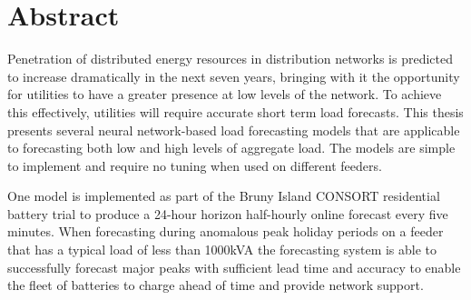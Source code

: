 
\chapter{Abstract}

Penetration of distributed energy resources in distribution networks is predicted to increase dramatically in the next seven years, bringing with it the opportunity for utilities to have a greater presence at low levels of the network.
To achieve this effectively, utilities will require accurate short term load forecasts.
This thesis presents several neural network-based load forecasting models that are applicable to forecasting both low and high levels of aggregate load.
The models are simple to implement and require no tuning when used on different feeders.

One model is implemented as part of the Bruny Island CONSORT residential battery trial to produce a 24-hour horizon half-hourly online forecast every five minutes.
When forecasting during anomalous peak holiday periods on a feeder that has a typical load of less than 1000kVA the forecasting system is able to successfully forecast major peaks with sufficient lead time and accuracy to enable the fleet of batteries to charge ahead of time and provide network support.